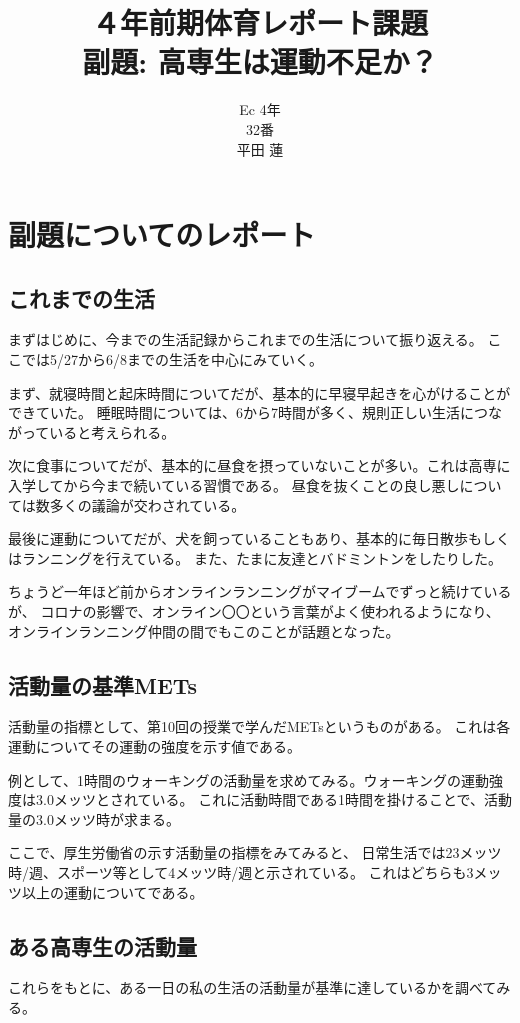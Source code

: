 \documentclass[titlepage]{jsarticle}
\title{４年前期体育レポート課題\\副題: 高専生は運動不足か？}
\author{Ec 4年\\32番\\平田 蓮}
\date{}
\begin{document}
\maketitle

\section{副題についてのレポート}
    \subsection{これまでの生活}
        まずはじめに、今までの生活記録からこれまでの生活について振り返える。
        ここでは5/27から6/8までの生活を中心にみていく。

        まず、就寝時間と起床時間についてだが、基本的に早寝早起きを心がけることができていた。
        睡眠時間については、6から7時間が多く、規則正しい生活につながっていると考えられる。

        次に食事についてだが、基本的に昼食を摂っていないことが多い。これは高専に入学してから今まで続いている習慣である。
        昼食を抜くことの良し悪しについては数多くの議論が交わされている。

        最後に運動についてだが、犬を飼っていることもあり、基本的に毎日散歩もしくはランニングを行えている。
        また、たまに友達とバドミントンをしたりした。

        ちょうど一年ほど前からオンラインランニングがマイブームでずっと続けているが、
        コロナの影響で、オンライン〇〇という言葉がよく使われるようになり、オンラインランニング仲間の間でもこのことが話題となった。

    \subsection{活動量の基準METs}
        活動量の指標として、第10回の授業で学んだMETsというものがある。
        これは各運動についてその運動の強度を示す値である。

        例として、1時間のウォーキングの活動量を求めてみる。ウォーキングの運動強度は3.0メッツとされている。
        これに活動時間である1時間を掛けることで、活動量の3.0メッツ時が求まる。

        ここで、厚生労働省の示す活動量の指標をみてみると、
        日常生活では23メッツ時/週、スポーツ等として4メッツ時/週と示されている。
        これはどちらも3メッツ以上の運動についてである。

    \subsection{ある高専生の活動量}
        これらをもとに、ある一日の私の生活の活動量が基準に達しているかを調べてみる。
        
\end{document}
